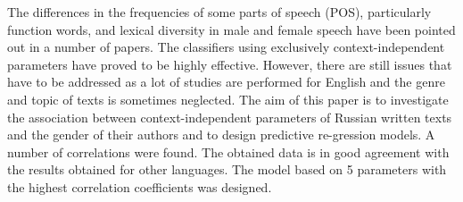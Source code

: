The differences in the frequencies of some parts of speech (POS), particularly function words, and lexical diversity in male and female speech have been pointed out in a number of papers. The classifiers using exclusively context-independent parameters have proved to be highly effective. However, there are still issues that have to be addressed as a lot of studies are performed for English and the genre and topic of texts is sometimes neglected. The aim of this paper is to investigate the association between context-independent parameters of Russian written texts and the gender of their authors and to design predictive re-gression models. A number of correlations were found. The obtained data is in good agreement with the results obtained for other languages. The model based on 5 parameters with the highest correlation coefficients was designed.
